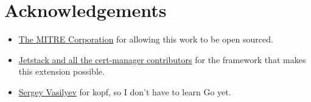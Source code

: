 \documentclass[11pt]{article}
\begin{document}
\section{Acknowledgements}
\label{sec:org11c9880}
\begin{itemize}
\item \href{https://www.mitre.org}{The MITRE Corporation} for allowing this work to be open sourced.
\item \href{https://cert-manager.io}{Jetstack and all the cert-manager contributors} for the framework that makes this extension possible.
\item \href{https://github.com/nolar}{Sergey Vasilyev} for kopf, so I don't have to learn Go yet.
\end{itemize}
\end{document}
